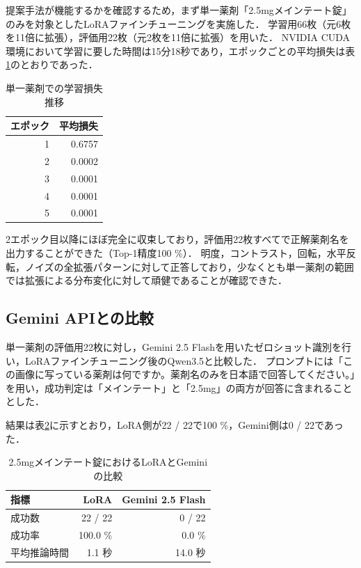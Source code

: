 \documentclass{ltjsarticle}
\begin{document}
提案手法が機能するかを確認するため，まず単一薬剤「2.5mgメインテート錠」のみを対象としたLoRAファインチューニングを実施した．
学習用66枚（元6枚を11倍に拡張），評価用22枚（元2枚を11倍に拡張）を用いた．
NVIDIA CUDA環境において学習に要した時間は15分18秒であり，エポックごとの平均損失は表\ref{tab:loss_meinte}のとおりであった．

\begin{table}[h]
\centering
\caption{単一薬剤での学習損失推移}
\label{tab:loss_meinte}
\begin{tabular}{rr}
\hline
エポック & 平均損失 \\
\hline
1 & 0.6757 \\
2 & 0.0002 \\
3 & 0.0001 \\
4 & 0.0001 \\
5 & 0.0001 \\
\hline
\end{tabular}
\end{table}

2エポック目以降にほぼ完全に収束しており，評価用22枚すべてで正解薬剤名を出力することができた（Top-1精度100 \%）．
明度，コントラスト，回転，水平反転，ノイズの全拡張パターンに対して正答しており，少なくとも単一薬剤の範囲では拡張による分布変化に対して頑健であることが確認できた．

\subsection{Gemini APIとの比較}

単一薬剤の評価用22枚に対し，Gemini 2.5 Flashを用いたゼロショット識別を行い，LoRAファインチューニング後のQwen3.5と比較した．
プロンプトには「この画像に写っている薬剤は何ですか。薬剤名のみを日本語で回答してください。」を用い，成功判定は「メインテート」と「2.5mg」の両方が回答に含まれることとした．

結果は表\ref{tab:vs_gemini}に示すとおり，LoRA側が22 / 22で100 \%，Gemini側は0 / 22であった．

\begin{table}[h]
\centering
\caption{2.5mgメインテート錠におけるLoRAとGeminiの比較}
\label{tab:vs_gemini}
\begin{tabular}{lrr}
\hline
指標 & LoRA & Gemini 2.5 Flash \\
\hline
成功数 & 22 / 22 & 0 / 22 \\
成功率 & 100.0 \% & 0.0 \% \\
平均推論時間 & 1.1 秒 & 14.0 秒 \\
\hline
\end{tabular}
\end{table}
\end{document}
